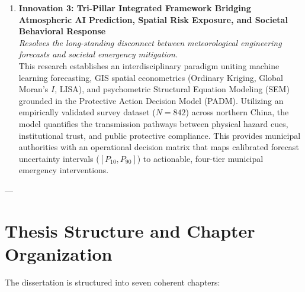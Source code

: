 \begin{enumerate}
    \item \textbf{Innovation 3: Tri-Pillar Integrated Framework Bridging Atmospheric AI Prediction, Spatial Risk Exposure, and Societal Behavioral Response} \\
    \textit{Resolves the long-standing disconnect between meteorological engineering forecasts and societal emergency mitigation.} \\
    This research establishes an interdisciplinary paradigm uniting machine learning forecasting, GIS spatial econometrics (Ordinary Kriging, Global Moran's $I$, LISA), and psychometric Structural Equation Modeling (SEM) grounded in the Protective Action Decision Model (PADM). Utilizing an empirically validated survey dataset ($N=842$) across northern China, the model quantifies the transmission pathways between physical hazard cues, institutional trust, and public protective compliance. This provides municipal authorities with an operational decision matrix that maps calibrated forecast uncertainty intervals ($[P_{10}, P_{90}]$) to actionable, four-tier municipal emergency interventions.
\end{enumerate}

---

\section{Thesis Structure and Chapter Organization}
\label{sec:thesis_organization}

The dissertation is structured into seven coherent chapters:

